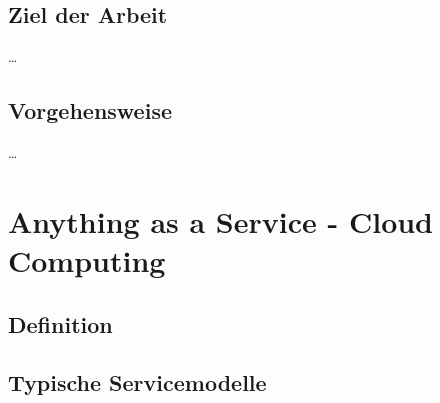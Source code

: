 \documentclass[12pt,toc=bib,toc=listof]{scrreprt}
\begin{document}

\section{Ziel der Arbeit} %
\label{sec:ziel_der_arbeit}

\ldots


\section{Vorgehensweise} %
\label{sec:vorgehensweise}

\ldots


\chapter{Anything as a Service - Cloud Computing} %
\label{sec:Anything as a Service - Cloud Computing}



\section{Definition} %
\label{sec:Definition}



\section{Typische Servicemodelle} %
\label{sec:Typische Servicemodelle}

\end{document}

